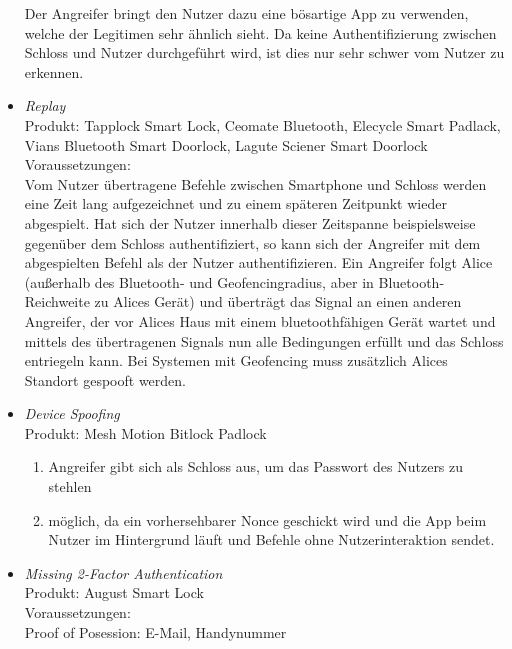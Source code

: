 \begin{itemize}[leftmargin=0cm,label={}]
                Der Angreifer bringt den Nutzer dazu eine bösartige App zu verwenden, welche der Legitimen sehr ähnlich sieht. 
                Da keine Authentifizierung zwischen Schloss und Nutzer durchgeführt wird, ist dies nur sehr schwer vom Nutzer zu erkennen.
            \item \emph{Replay}\cite{Tierney2018,Rose2016,Ho2016}\\
                Produkt: Tapplock Smart Lock, Ceomate Bluetooth, Elecycle Smart Padlack, Vians Bluetooth Smart Doorlock, Lagute Sciener Smart Doorlock\\
                Voraussetzungen: \\  
                Vom Nutzer übertragene Befehle zwischen Smartphone und Schloss werden eine Zeit lang aufgezeichnet und zu einem späteren Zeitpunkt wieder abgespielt. 
                Hat sich der Nutzer innerhalb dieser Zeitspanne beispielsweise gegenüber dem Schloss authentifiziert, so kann sich der Angreifer mit dem abgespielten Befehl als der Nutzer authentifizieren.
                Ein Angreifer folgt Alice (außerhalb des Bluetooth- und Geofencingradius, aber in Bluetooth-Reichweite zu Alices Gerät) und überträgt das Signal an einen anderen Angreifer, der vor Alices Haus mit einem bluetoothfähigen Gerät wartet und mittels des übertragenen Signals nun alle Bedingungen erfüllt und das Schloss entriegeln kann.
                Bei Systemen mit Geofencing muss zusätzlich Alices Standort gespooft werden.
            \item \emph{Device Spoofing}\cite{Rose2016}\\
                Produkt: Mesh Motion Bitlock Padlock\\
                \begin{enumerate}[noitemsep]
    	            \item Angreifer gibt sich als Schloss aus, um das Passwort des Nutzers zu stehlen
    	            \item möglich, da ein vorhersehbarer Nonce geschickt wird und die App beim Nutzer im Hintergrund läuft und Befehle ohne Nutzerinteraktion sendet.
    	        \end{enumerate}
	        \item \emph{Missing 2-Factor Authentication}\cite{Jmaxxz2015}\\
                Produkt: August Smart Lock\\
                Voraussetzungen: \\  
                Proof of Posession: E-Mail, Handynummer\\

\end{itemize}
